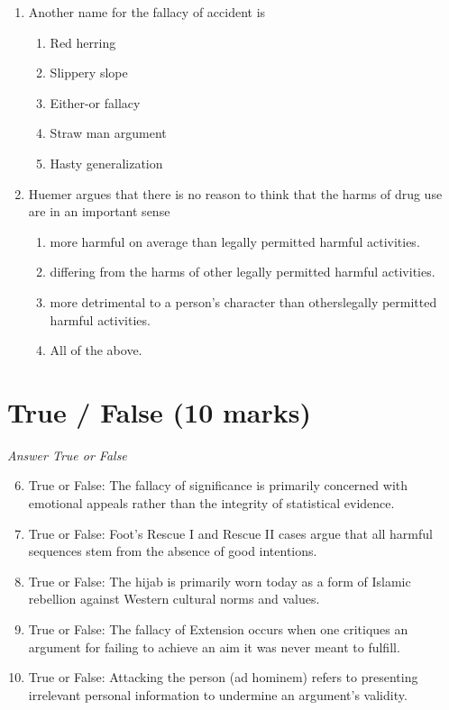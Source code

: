 \documentclass[12pt]{article}
\begin{document}
\begin{enumerate}[label=\arabic*.]
\item Another name for the fallacy of accident is
\begin{enumerate}[label=(\alph*)]
    \item Red herring
    \item Slippery slope
    \item Either-or fallacy
    \item Straw man argument
    \item Hasty generalization
\end{enumerate}
\item Huemer argues that there is no reason to think that the harms of drug use are in an important sense
\begin{enumerate}[label=(\alph*)]
    \item more harmful on average than legally permitted harmful activities.
    \item differing from the harms of other legally permitted harmful activities.
    \item more detrimental to a person's character than otherslegally permitted harmful activities.
    \item All of the above.
\end{enumerate}
\end{enumerate}

\section*{True / False (10 marks)}
\textit{Answer True or False}
\begin{enumerate}[label=\arabic*.]
\setcounter{enumi}{5}
\item True or False: The fallacy of significance is primarily concerned with emotional appeals rather than the integrity of statistical evidence.
\item True or False: Foot's Rescue I and Rescue II cases argue that all harmful sequences stem from the absence of good intentions.
\item True or False: The hijab is primarily worn today as a form of Islamic rebellion against Western cultural norms and values.
\item True or False: The fallacy of Extension occurs when one critiques an argument for failing to achieve an aim it was never meant to fulfill.
\item True or False: Attacking the person (ad hominem) refers to presenting irrelevant personal information to undermine an argument's validity.
\end{enumerate}
\end{document}
